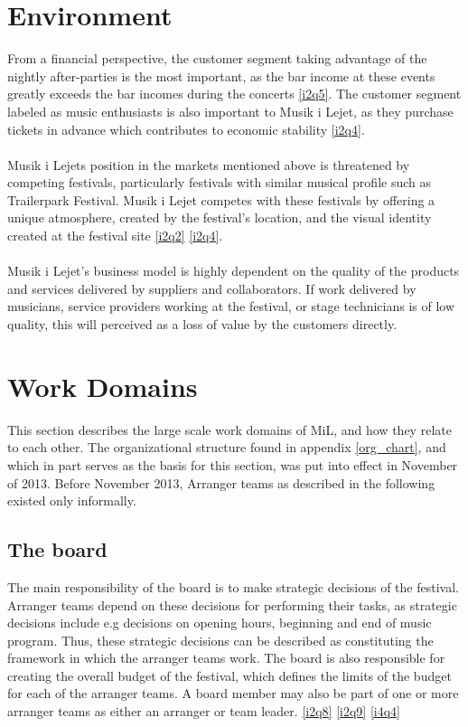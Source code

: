 \section{Environment}
From a financial perspective, the customer segment taking advantage of the nightly after-parties is the most important, as the bar income at these events greatly exceeds the bar incomes during the concerts \ref{i2q5}. The customer segment labeled as music enthusiasts is also important to Musik i Lejet, as they purchase tickets in advance which contributes to economic stability \ref{i2q4}.
\\ \\
Musik i Lejets position in the markets mentioned above is threatened by competing festivals, particularly festivals with similar musical profile such as Trailerpark Festival. Musik i Lejet competes with these festivals by offering a unique atmosphere, created by the festival's location, and the visual identity created at the festival site \ref{i2q2} \ref{i2q4}.
\\ \\
Musik i Lejet's business model is highly dependent on the quality of the products and services delivered by suppliers and collaborators. If work delivered by musicians, service providers working at the festival, or stage technicians is of low quality, this will perceived as a loss of value by the customers directly.

\section{Work Domains}
\label{sec:work_domains}
This section describes the large scale work domains of MiL, and how they relate to each other. The organizational structure found in appendix \ref{org_chart}, and which in part serves as the basis for this section, was put into effect in November of 2013. Before November 2013, Arranger teams as described in the following existed only informally.
\subsection{The board}
\label{sub:the_board}
The main responsibility of the board is to make strategic decisions of the festival. Arranger teams depend on these decisions for performing their tasks, as strategic decisions include e.g decisions on opening hours, beginning and end of music program. Thus, these strategic decisions can be described as constituting the framework in which the arranger teams work. The board is also responsible for creating the overall budget of the festival, which defines the limits of the budget for each of the arranger teams. A board member may also be part of one or more arranger teams as either an arranger or team leader. \ref{i2q8} \ref{i2q9} \ref{i4q4}

